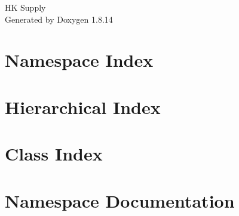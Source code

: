 \documentclass[twoside]{book}
\newcommand{\+}{\discretionary{\mbox{\scriptsize$\hookleftarrow$}}{}{}}
\newcommand{\clearemptydoublepage}{%
  \newpage{\pagestyle{empty}\cleardoublepage}%
}
\begin{document}
\hypersetup{pageanchor=false,
             bookmarksnumbered=true,
             pdfencoding=unicode
            }
\begin{titlepage}
\vspace*{7cm}
\begin{center}%
{\Large HK Supply }\\
\vspace*{1cm}
{\large Generated by Doxygen 1.8.14}\\
\end{center}
\end{titlepage}
\clearemptydoublepage
{}
\tableofcontents
\clearemptydoublepage
{}
\hypersetup{pageanchor=true}

\chapter{Namespace Index}

\chapter{Hierarchical Index}

\chapter{Class Index}

\chapter{Namespace Documentation}




































\end{document}

